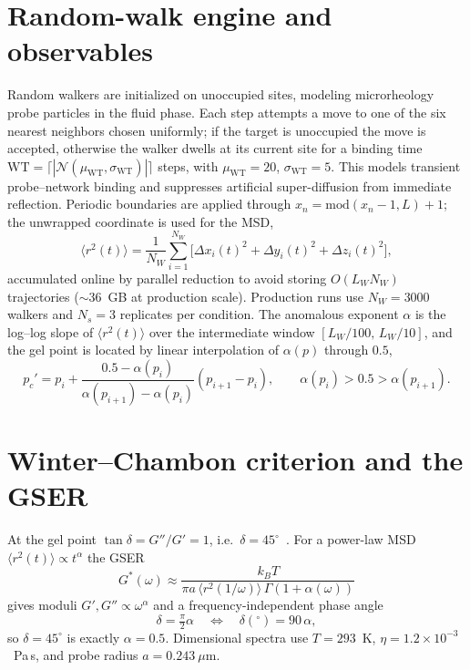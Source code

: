 \documentclass[aps,prl,twocolumn,superscriptaddress,floatfix,nofootinbib]{revtex4-2}
\newcommand{\msd}{\langle r^2(t)\rangle}
\newcommand{\pcp}{p_c'}
\begin{document}
\section{Random-walk engine and observables}
Random walkers are initialized on unoccupied sites, modeling microrheology probe particles in the
fluid phase. Each step attempts a move to one of the six nearest neighbors chosen uniformly; if the
target is unoccupied the move is accepted, otherwise the walker dwells at its current site for a
binding time $\mathrm{WT}=\lceil|\mathcal{N}(\mu_{\mathrm{WT}},\sigma_{\mathrm{WT}})|\rceil$ steps,
with $\mu_{\mathrm{WT}}=20$, $\sigma_{\mathrm{WT}}=5$. This models transient probe--network binding
and suppresses artificial super-diffusion from immediate reflection. Periodic boundaries are
applied through $x_n=\mathrm{mod}(x_n-1,L)+1$; the unwrapped coordinate is used for the MSD,
\begin{equation}
  \msd=\frac{1}{N_W}\sum_{i=1}^{N_W}\big[\Delta x_i(t)^2+\Delta y_i(t)^2+\Delta z_i(t)^2\big],
\end{equation}
accumulated online by parallel reduction to avoid storing $O(L_W N_W)$ trajectories
($\sim$36~GB at production scale). Production runs use $N_W=3000$ walkers and $N_s=3$ replicates
per condition. The anomalous exponent $\alpha$ is the log--log slope of $\msd$ over the intermediate
window $[L_W/100,\,L_W/10]$, and the gel point is located by linear interpolation of $\alpha(p)$
through $0.5$,
\begin{equation}
  \pcp=p_i+\frac{0.5-\alpha(p_i)}{\alpha(p_{i+1})-\alpha(p_i)}(p_{i+1}-p_i),
  \qquad \alpha(p_i)>0.5>\alpha(p_{i+1}).
\end{equation}

\section{Winter--Chambon criterion and the GSER}
At the gel point $\tan\delta=G''/G'=1$, i.e.\ $\delta=45^{\circ}$~\cite{Winter1987,Chambon1987}.
For a power-law MSD $\msd\propto t^{\alpha}$ the GSER~\cite{Mason1995,Mason2000}
\begin{equation}
  G^*(\omega)\approx\frac{k_BT}{\pi a\,\langle r^2(1/\omega)\rangle\,\Gamma(1+\alpha(\omega))}
\end{equation}
gives moduli $G',G''\propto\omega^{\alpha}$ and a frequency-independent phase angle
\begin{equation}
  \delta=\tfrac{\pi}{2}\alpha \quad\Longleftrightarrow\quad \delta(^{\circ})=90\,\alpha,
\end{equation}
so $\delta=45^{\circ}$ is exactly $\alpha=0.5$. Dimensional spectra use $T=293$~K,
$\eta=1.2\times10^{-3}$~Pa\,s, and probe radius $a=0.243~\mu$m.
\end{document}
